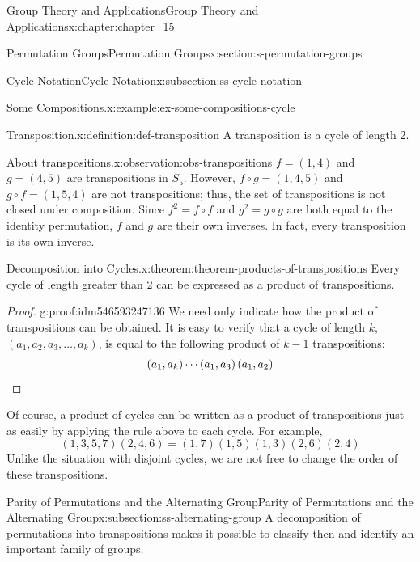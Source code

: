 \documentclass[oneside,10pt,]{book}
\newcommand{\qedhere}{\relax}
\numberwithin{equation}{section}
\begin{document}
\begin{chapterptx}{Group Theory and Applications}{}{Group Theory and Applications}{}{}{x:chapter:chapter_15}
\begin{sectionptx}{Permutation Groups}{}{Permutation Groups}{}{}{x:section:s-permutation-groups}
\begin{subsectionptx}{Cycle Notation}{}{Cycle Notation}{}{}{x:subsection:ss-cycle-notation}
\begin{example}{Some Compositions.}{x:example:ex-some-compositions-cycle}
\end{example}
\begin{definition}{Transposition.}{x:definition:def-transposition}%
%
A transposition is a cycle of length 2.%
\end{definition}
\begin{observation}{About transpositions.}{x:observation:obs-transpositions}%
\(f= (1, 4)\) and \(g=(4,5)\) are transpositions in \(S_5\).  However, \(f\circ g = (1,4, 5)\) and \(g \circ f = (1, 5, 4)\) are not transpositions; thus, the set of transpositions is not closed under composition. Since \(f^2=f\circ f\) and \(g^2=g\circ
g\) are both equal to the identity permutation,  \(f\) and \(g\) are their own inverses. In fact, every transposition is its own inverse.%
\end{observation}
\begin{theorem}{Decomposition into Cycles.}{}{x:theorem:theorem-products-of-transpositions}%
Every cycle of length greater than 2 can be expressed as a product of transpositions.%
\end{theorem}
\begin{proof}{}{g:proof:idm546593247136}
We need only indicate how the product of transpositions can be obtained. It is easy to verify that a cycle of length \(k\), \(\left(a_1, a_2, a_3, \ldots , a_k\right)\), is equal to the following product of \(k-1\) transpositions:%
\begin{equation*}
\left(a_1, a_k\right) \cdots \left(a_1,a_3\right)\left(a_1,a_2\right)\qedhere
\end{equation*}
%
\end{proof}
Of course, a product of cycles can be written as a product of transpositions just as easily by applying the rule above to each cycle. For example,%
\begin{equation*}
(1, 3, 5, 7)(2, 4, 6) = (1, 7)(1, 5)(1, 3)(2, 6)(2, 4)
\end{equation*}
Unlike the situation with disjoint cycles, we are not free to change the order of these transpositions.%
\end{subsectionptx}
%
%
\typeout{************************************************}
\typeout{************************************************}
%
\begin{subsectionptx}{Parity of Permutations and the Alternating Group}{}{Parity of Permutations and the Alternating Group}{}{}{x:subsection:ss-alternating-group}
A decomposition of permutations into transpositions makes it possible to classify then and identify an important family of groups.%

\end{subsectionptx}
\end{sectionptx}
\end{chapterptx}
\end{document}

